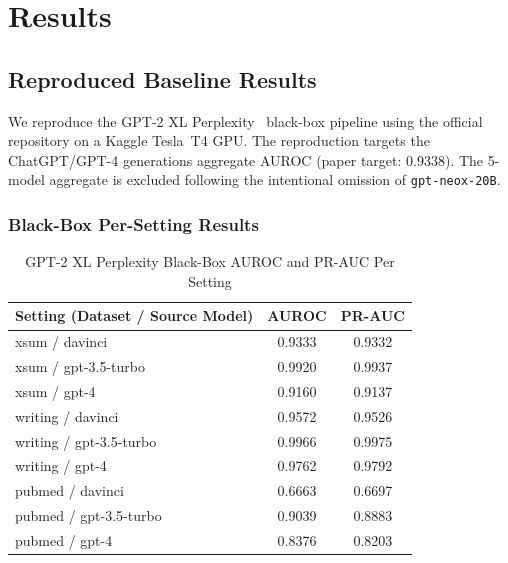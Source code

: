 \documentclass[conference]{IEEEtran}
\begin{document}
\section{Results}\label{sec:results}

\subsection{Reproduced Baseline Results}\label{ssec:reproduced}

We reproduce the GPT-2 XL Perplexity~\cite{bao2024} black-box pipeline using
the official repository on a Kaggle Tesla~T4 GPU. The reproduction targets
the ChatGPT/GPT-4 generations aggregate AUROC (paper target: 0.9338). The
5-model aggregate is excluded following the intentional omission of
\texttt{gpt-neox-20B}.

\subsubsection{Black-Box Per-Setting Results}

\begin{table}[t]
\caption{GPT-2 XL Perplexity Black-Box AUROC and PR-AUC Per Setting}
\label{tab:blackbox}
\begin{center}
\small
\begin{tabular}{lcc}
\toprule
\textbf{Setting (Dataset / Source Model)} & \textbf{AUROC} & \textbf{PR-AUC}\\
\midrule
xsum / davinci          & 0.9333 & 0.9332\\
xsum / gpt-3.5-turbo    & 0.9920 & 0.9937\\
xsum / gpt-4            & 0.9160 & 0.9137\\
writing / davinci       & 0.9572 & 0.9526\\
writing / gpt-3.5-turbo & 0.9966 & 0.9975\\
writing / gpt-4         & 0.9762 & 0.9792\\
pubmed / davinci        & 0.6663 & 0.6697\\
pubmed / gpt-3.5-turbo  & 0.9039 & 0.8883\\
pubmed / gpt-4          & 0.8376 & 0.8203\\
\bottomrule
\end{tabular}
\end{center}
\end{table}
\end{document}

